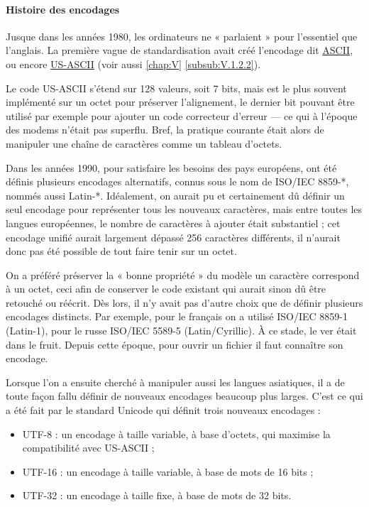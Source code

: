 \paragraph{Histoire des encodages} Jusque dans les années 1980, les ordinateurs ne « parlaient » pour l'essentiel que l'anglais. La première vague de standardisation avait créé l'encodage dit \href{http://www.asciitable.com/}{ASCII}, ou encore \href{https://en.wikipedia.org/wiki/ASCII}{US-ASCII} (voir aussi \cref{chap:V}  \cref{subsub:V.1.2.2}).

Le code US-ASCII s'étend sur 128 valeurs, soit 7 bits, mais est le plus souvent implémenté sur un octet pour préserver l'alignement, le dernier bit pouvant être utilisé par exemple pour ajouter un code correcteur d'erreur --- ce qui à l'époque des modems n'était pas superflu. Bref, la pratique courante était alors de manipuler une chaîne de caractères comme un tableau d'octets.

Dans les années 1990, pour satisfaire les besoins des pays européens, ont été définis plusieurs encodages alternatifs, connus sous le nom de ISO/IEC 8859-*, nommés aussi Latin-*. Idéalement, on aurait pu et certainement dû définir un seul encodage pour représenter tous les nouveaux caractères, mais entre toutes les langues européennes, le nombre de caractères à ajouter était substantiel ; cet encodage unifié aurait largement dépassé 256 caractères différents, il n'aurait donc pas été possible de tout faire tenir sur un octet.

On a préféré préserver la « bonne propriété » du modèle un caractère correspond à un octet, ceci afin de conserver le code existant qui aurait sinon dû être retouché ou réécrit. Dès lors, il n'y avait pas d'autre choix que de définir plusieurs encodages distincts. Par exemple, pour le français on a utilisé ISO/IEC 8859-1 (Latin-1), pour le russe ISO/IEC 5589-5 (Latin/Cyrillic).
À ce stade, le ver était dans le fruit. Depuis cette époque, pour ouvrir un fichier il faut connaître son encodage.

Lorsque l'on a ensuite cherché à manipuler aussi les langues asiatiques, il a de toute façon fallu définir de nouveaux encodages beaucoup plus larges. C'est ce qui a été fait par le standard Unicode qui définit trois nouveaux encodages :
\begin{itemize}
	\item UTF-8 : un encodage à taille variable, à base d'octets, qui maximise la compatibilité avec US-ASCII ;
	\item UTF-16 : un encodage à taille variable, à base de mots de 16 bits ;
	\item UTF-32 : un encodage à taille fixe, à base de mots de 32 bits.
\end{itemize}

